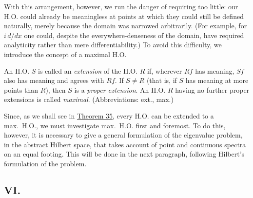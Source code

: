 ﻿\documentclass[paper=b5,fontsize=13pt,bookmarkpackage=false,twoside]{scrartcl}
\begin{document}
With this arrangement, however, we run the danger of requiring too little: our H.O. could already be meaningless at points at which they could still be defined naturally, merely because the domain was narrowed arbitrarily. (For example, for $i\,d/dx$ one could, despite the everywhere-denseness of the domain, have required analyticity rather than mere differentiability.) To avoid this difficulty, we introduce the concept of a maximal H.O.

An H.O. $S$ is called an \emph{extension} of the H.O. $R$ if, wherever $Rf$ has meaning, $Sf$ also has meaning and agrees with $Rf$. If $S\ne R$ (that is, if $S$ has meaning at more points than $R$), then $S$ is a \emph{proper extension}. An H.O. $R$ having no further proper extensions is called \emph{maximal}. (Abbreviations: ext., max.)

Since, as we shall see in \hyperref[thm:35]{Theorem 35}, every H.O. can be extended to a max.\ H.O., we must investigate max.\ H.O. first and foremost. To do this, however, it is necessary to give a general formulation of the eigenvalue problem, in the abstract Hilbert space, that takes account of point and continuous spectra on an equal footing. This will be done in the next paragraph, following Hilbert's formulation of the problem.

\subsection*{VI.}\label{intro:VI}
\end{document}
